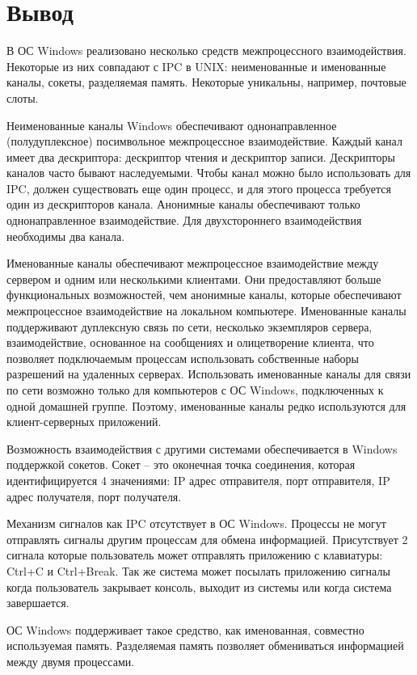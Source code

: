 \documentclass[a4paper]{article}
\begin{document}
\section{Вывод}
	В ОС Windows реализовано несколько средств межпроцессного взаимодействия. Некоторые из них совпадают с IPC в UNIX: неименованные и именованные каналы, сокеты, разделяемая память. Некоторые уникальны, например, почтовые слоты.
	
	Неименованные каналы Windows обеспечивают однонаправленное (полудуплексное) посимвольное межпроцессное взаимодействие. Каждый канал имеет два дескриптора: дескриптор чтения и дескриптор записи. Дескрипторы каналов часто бывают наследуемыми. Чтобы канал можно было использовать для IPC, должен существовать еще один процесс, и для этого процесса требуется один из дескрипторов канала. 
Анонимные каналы обеспечивают только однонаправленное взаимодействие. Для двухстороннего взаимодействия необходимы два канала. 

	Именованные каналы обеспечивают межпроцессное взаимодействие между сервером и одним или несколькими клиентами. Они предоставляют больше функциональных возможностей, чем анонимные каналы, которые обеспечивают межпроцессное взаимодействие на локальном компьютере. Именованные каналы поддерживают дуплексную связь по сети, несколько экземпляров сервера, взаимодействие, основанное на сообщениях и олицетворение клиента, что позволяет подключаемым процессам использовать собственные наборы разрешений на удаленных серверах. Использовать именованные каналы для связи по сети возможно только для компьютеров с ОС Windows, подключенных к одной домашней группе. Поэтому, именованные каналы редко используются для клиент-серверных приложений.
	
	Возможность взаимодействия с другими системами обеспечивается в Windows поддержкой сокетов. Сокет – это оконечная точка соединения, которая идентифицируется 4 значениями: IP адрес отправителя, порт отправителя, IP адрес получателя, порт получателя. 
	
	Механизм сигналов как IPC отсутствует в ОС Windows. Процессы не могут отправлять сигналы другим процессам для обмена информацией. Присутствует 2 сигнала которые пользователь может отправлять приложению с клавиатуры: Ctrl+C и Ctrl+Break. Так же система может посылать приложению сигналы когда пользователь закрывает консоль, выходит из системы или когда система завершается.
	
	ОС Windows поддерживает такое средство, как именованная, совместно используемая память. Разделяемая память позволяет обмениваться информацией между двумя процессами.
	
\end{document}

